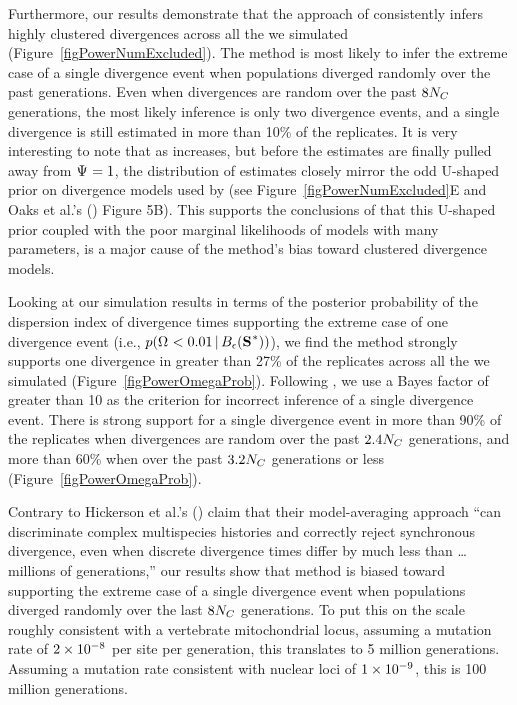 \documentclass[letterpaper,12pt]{article}
\begin{document}
\begin{linenumbers}
Furthermore, our results demonstrate that the approach of \citet{Hickerson2013}
consistently infers highly clustered divergences across all the  we
simulated (Figure~\ref{figPowerNumExcluded}).
The method is most likely to infer the extreme case of a single divergence event
when populations diverged randomly over the past \globalcoalunit generations.
Even when divergences are random over the past $8N_C$ generations,
the most likely inference is only two divergence events, and a single 
divergence is still estimated in more than 10\% of the replicates.
It is very interesting to note that as  increases, but before the
estimates are finally pulled away from $\Psi_{} = 1$, the distribution of
\numt{} estimates closely mirror the odd U-shaped prior on divergence models
used by \msb (see Figure~\ref{figPowerNumExcluded}E and Oaks et al.'s
(\citeyear{Oaks2012}) Figure 5B).
This supports the conclusions of \citet{Oaks2012} that this U-shaped
prior coupled with the poor marginal likelihoods of models with many
\divt{} parameters, is a major cause of the method's bias toward
clustered divergence models.

Looking at our simulation results in terms of the posterior probability of the
dispersion index of divergence times supporting the extreme case of one
divergence event (i.e., $p(\vmratio{} < 0.01 \given \ssSpace)$), we find the
method strongly supports one divergence in greater than 27\% of the replicates
across all the  we simulated (Figure~\ref{figPowerOmegaProb}).
Following \citet{Hickerson2013}, we use a Bayes factor of greater than 10 as
the criterion for incorrect inference of a single divergence event.
There is strong support for a single divergence event in more than 90\% of the
replicates when divergences are random over the past $2.4N_C$
generations, and more than 60\% when over the past $3.2N_C$
generations or less (Figure~\ref{figPowerOmegaProb}).

Contrary to Hickerson et al.'s (\citeyear{Hickerson2013}) claim that their
model-averaging approach ``can discriminate complex multispecies histories and
correctly reject synchronous divergence, even when discrete divergence times
differ by much less than \ldots millions of generations,'' our results show
that method is biased toward supporting the extreme case of a single
divergence event when populations diverged randomly over the last
$8N_C$ generations.
To put this on the scale roughly consistent with a vertebrate mitochondrial
locus, assuming a mutation rate of $2\times 10^{-8}$ per site per generation, this
translates to 5 million generations.
Assuming a mutation rate consistent with nuclear loci of $1\times 10^{-9}$, this is 100
million generations.


\end{linenumbers}
\end{document}
